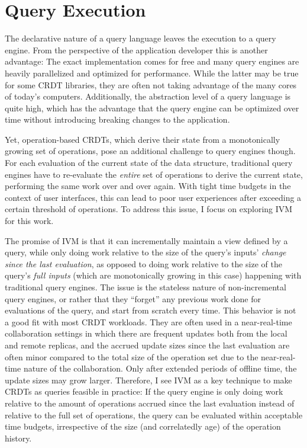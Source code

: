 \section{Query Execution}

The declarative nature of a query language leaves the execution to a query engine.
From the perspective of the application developer this is another advantage:
The exact implementation comes for free and many query engines are heavily
parallelized and optimized for performance. While the latter may be true
for some \ac{CRDT} libraries, they are often not taking advantage of the many
cores of today's computers.
Additionally, the abstraction level of a query language is quite high,
which has the advantage that the query engine can be optimized over time without
introducing breaking changes to the application.

Yet, operation-based \acp{CRDT}, which derive their state from a monotonically
growing set of operations, pose an additional challenge to query engines though.
For each evaluation of the current state of the data structure,
traditional query engines have to re-evaluate the \emph{entire}
set of operations to derive the current state, performing the same work over
and over again.
With tight time budgets in the context of user interfaces, this can lead to
poor user experiences after exceeding a certain threshold of operations.
To address this issue, I focus on exploring \ac{IVM} for this work.

The promise of \ac{IVM} is that it can incrementally maintain a view defined
by a query, while only doing work relative to the size of the query's
inputs' \emph{change since the last evaluation}, as opposed to doing work
relative to the size of the query's \emph{full inputs} (which are monotonically
growing in this case) happening with traditional query engines.
The issue is the stateless nature of non-incremental query engines, or rather
that they ``forget'' any previous work done for evaluations of the query,
and start from scratch every time.
This behavior is not a good fit with most \ac{CRDT} workloads.
They are often used in a near-real-time collaboration settings in which there
are frequent updates both from the local and remote replicas, and the accrued
update sizes since the last evaluation are often minor compared to the total
size of the operation set due to the near-real-time nature of the collaboration.
Only after extended periods of offline time, the update sizes may grow larger.
Therefore, I see \ac{IVM} as a key technique to make \acp{CRDT} as queries
feasible in practice:
If the query engine is only doing work relative to the amount of operations
accrued since the last evaluation instead of relative to the full set of
operations, the query can be evaluated within acceptable time budgets,
irrespective of the size (and correlatedly age) of the operation history.

